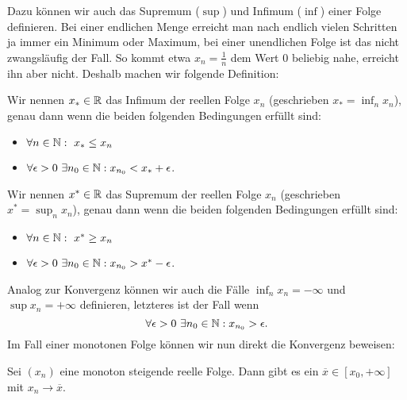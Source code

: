 Dazu können wir auch das Supremum (\(\sup\)) und Infimum (\(\inf\)) einer Folge definieren. Bei einer endlichen Menge erreicht man nach endlich vielen Schritten ja immer ein Minimum oder Maximum, bei einer unendlichen Folge ist das nicht zwangsläufig der Fall. So kommt etwa \(x_n = \frac{1}n\) dem Wert \(0\) beliebig nahe, erreicht ihn aber nicht. Deshalb machen wir folgende Definition:
\label{vorkurs/folgen:definition-7}
\begin{definition}{}{}



Wir nennen \(x_* \in \mathbb{R}\) das Infimum der reellen Folge \(x_n\) (geschrieben \(x_* = \inf_n x_n\)), genau dann wenn die beiden folgenden Bedingungen erfüllt sind:
\begin{itemize}
\item {} 
\(\forall n \in \mathbb{N}:~x_* \leq x_n\)

\item {} 
\(\forall \epsilon > 0~\exists n_0 \in \mathbb{N}: x_{n_0} < x_* + \epsilon\).

\end{itemize}

Wir nennen \(x^* \in \mathbb{R}\) das Supremum der reellen Folge \(x_n\) (geschrieben \(x^* = \sup_n x_n\)), genau dann wenn die beiden folgenden Bedingungen erfüllt sind:
\begin{itemize}
\item {} 
\(\forall n \in \mathbb{N}:~x^* \geq x_n\)

\item {} 
\(\forall \epsilon > 0~\exists n_0 \in \mathbb{N}: x_{n_0} > x^* -\epsilon\).

\end{itemize}
\end{definition}

Analog zur Konvergenz können wir auch die Fälle \(\inf_n x_n = - \infty\) und \(\sup x_n = +\infty\) definieren, letzteres ist der Fall wenn
\begin{equation*}
 \forall \epsilon > 0~\exists n_0 \in \mathbb{N}: x_{n_0} > \epsilon .\end{equation*}
Im Fall einer monotonen Folge können wir nun direkt die Konvergenz beweisen:
\label{vorkurs/folgen:theorem-8}
\begin{theorem}{}{}



Sei \((x_n)\) eine monoton steigende reelle Folge. Dann gibt es ein \(\overline{x} \in [x_0,+\infty]\) mit \(x_n \rightarrow \overline{x}\).
\end{theorem}

